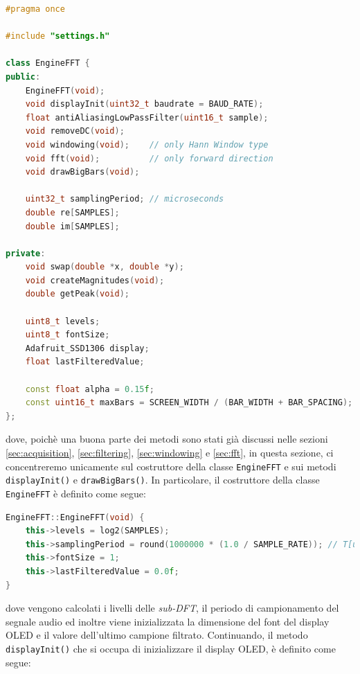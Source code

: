 \documentclass[a4paper,12pt]{report}  %
\newcommand{\lstinlinebg}[1]{\colorbox{backcolour}{\lstinline|#1|}}
\begin{document}
\begin{lstlisting}[language=C++, keywords={class, public, private, uint16_t, uint8_t, float, constexpr, static, void, double, uint32_t, Adafruit_SSD1306, const}]
#pragma once

#include "settings.h"

class EngineFFT {
public:
    EngineFFT(void);
    void displayInit(uint32_t baudrate = BAUD_RATE);
    float antiAliasingLowPassFilter(uint16_t sample);
    void removeDC(void);
    void windowing(void);    // only Hann Window type
    void fft(void);          // only forward direction
    void drawBigBars(void);

    uint32_t samplingPeriod; // microseconds
    double re[SAMPLES];
    double im[SAMPLES];

private:
    void swap(double *x, double *y);
    void createMagnitudes(void);
    double getPeak(void);
    
    uint8_t levels;
    uint8_t fontSize;
    Adafruit_SSD1306 display;
    float lastFilteredValue;

    const float alpha = 0.15f;
    const uint16_t maxBars = SCREEN_WIDTH / (BAR_WIDTH + BAR_SPACING);
};
\end{lstlisting}

dove, poichè una buona parte dei metodi sono stati già discussi nelle sezioni \ref{sec:acquisition}, \ref{sec:filtering}, \ref{sec:windowing} e \ref{sec:fft}, in questa sezione, ci concentreremo unicamente sul costruttore della classe \lstinlinebg{EngineFFT} e sui metodi \lstinlinebg{displayInit()} e \lstinlinebg{drawBigBars()}.
In particolare, il costruttore della classe \lstinlinebg{EngineFFT} è definito come segue:

\begin{lstlisting}[language=C++, keywords={void, log2, uint32_t, this, round}]
EngineFFT::EngineFFT(void) {
    this->levels = log2(SAMPLES);
    this->samplingPeriod = round(1000000 * (1.0 / SAMPLE_RATE)); // T[us] = 1 / f => T * 10^(-6) = 1 / f => T = 10^6 / f
    this->fontSize = 1;
    this->lastFilteredValue = 0.0f;
}
\end{lstlisting}

dove vengono calcolati i livelli delle \textit{sub-DFT}, il periodo di campionamento del segnale audio ed inoltre viene inizializzata la dimensione del font del display OLED e il valore dell'ultimo campione filtrato.
Continuando, il metodo \lstinlinebg{displayInit()} che si occupa di inizializzare il display OLED, è definito come segue:
\end{document}
